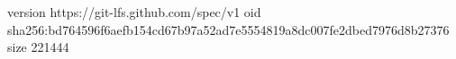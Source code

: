 version https://git-lfs.github.com/spec/v1
oid sha256:bd764596f6aefb154cd67b97a52ad7e5554819a8dc007fe2dbed7976d8b27376
size 221444
